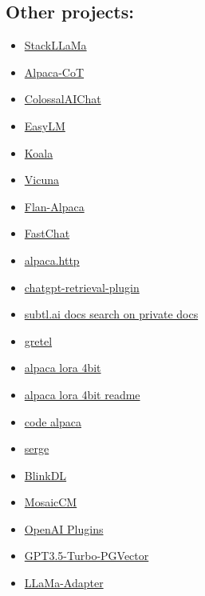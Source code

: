 \documentclass{article}
\begin{document}
\subsection*{Other projects:}
\begin{itemize}
    \item \href{https://huggingface.co/blog/stackllama}{StackLLaMa}
    \item \href{https://github.com/PhoebusSi/alpaca-CoT}{Alpaca-CoT}
    \item \href{https://github.com/hpcaitech/ColossalAI/tree/main/applications/Chat}{ColossalAIChat}
    \item \href{https://github.com/young-geng/EasyLM.git}{EasyLM}
    \item \href{https://bair.berkeley.edu/blog/2023/04/03/koala/}{Koala}
    \item \href{https://vicuna.lmsys.org/}{Vicuna}
    \item \href{https://github.com/declare-lab/flan-alpaca}{Flan-Alpaca}
    \item \href{https://chat.lmsys.org/}{FastChat}
    \item \href{https://github.com/Nuked88/alpaca.http}{alpaca.http}
    \item \href{https://github.com/openai/chatgpt-retrieval-plugin}{chatgpt-retrieval-plugin}
    \item \href{https://www.subtl.ai/}{subtl.ai docs search on private docs}
    \item \href{https://gretel.ai/}{gretel}
    \item \href{https://github.com/johnsmith0031/alpaca_lora_4bit}{alpaca lora 4bit}
    \item \href{https://github.com/s4rduk4r/alpaca_lora_4bit_readme}{alpaca lora 4bit readme}
    \item \href{https://github.com/sahil280114/codealpaca}{code alpaca}
    \item \href{https://github.com/nsarrazin/serge}{serge}
    \item \href{https://github.com/BlinkDL}{BlinkDL}
    \item \href{https://github.com/mosaicml/examples#large-language-models-llms}{MosaicCM}
    \item \href{https://openai.com/blog/chatgpt-plugins}{OpenAI Plugins}
    \item \href{https://github.com/gannonh/gpt3.5-turbo-pgvector}{GPT3.5-Turbo-PGVector}
    \item \href{https://github.com/ZrrSkywalker/LLaMA-Adapter}{LLaMa-Adapter}

\end{itemize}
\end{document}
